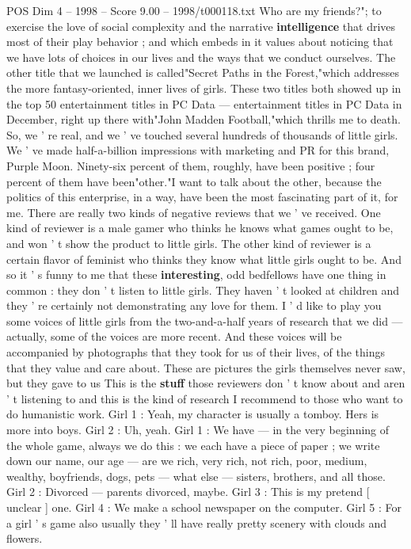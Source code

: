 \begin{textsample}{POS Dim 4 – 1998 – Score 9.00 – 1998/t000118.txt}
Who are my friends?"; to exercise the love of social complexity and the narrative \textbf{intelligence} that drives most of their play behavior ; and which embeds in it values about noticing that we have lots of choices in our lives and the ways that we conduct ourselves.
The other title that we launched is called"Secret Paths in the Forest,"which addresses the more fantasy-oriented, inner lives of girls.
These two titles both showed up in the top 50 entertainment titles in PC Data — entertainment titles in PC Data in December, right up there with"John Madden Football,"which thrills me to death.
So, we ' re real, and we ' ve touched several hundreds of thousands of little girls.
We ' ve made half-a-billion impressions with marketing and PR for this brand, Purple Moon.
Ninety-six percent of them, roughly, have been positive ; four percent of them have been"other."I want to talk about the other, because the politics of this enterprise, in a way, have been the most fascinating part of it, for me.
There are really two kinds of negative reviews that we ' ve received.
One kind of reviewer is a male gamer who thinks he knows what games ought to be, and won ' t show the product to little girls.
The other kind of reviewer is a certain flavor of feminist who thinks they know what little girls ought to be.
And so it ' s funny to me that these \textbf{interesting}, odd bedfellows have one thing in common : they don ' t listen to little girls.
They haven ' t looked at children and they ' re certainly not demonstrating any love for them.
I ' d like to play you some voices of little girls from the two-and-a-half years of research that we did — actually, some of the voices are more recent.
And these voices will be accompanied by photographs that they took for us of their lives, of the things that they value and care about.
These are pictures the girls themselves never saw, but they gave to us This is the \textbf{stuff} those reviewers don ' t know about and aren ' t listening to and this is the kind of research I recommend to those who want to do humanistic work.
Girl 1 : Yeah, my character is usually a tomboy.
Hers is more into boys.
Girl 2 : Uh, yeah.
Girl 1 : We have — in the very beginning of the whole game, always we do this : we each have a piece of paper ; we write down our name, our age — are we rich, very rich, not rich, poor, medium, wealthy, boyfriends, dogs, pets — what else — sisters, brothers, and all those.
Girl 2 : Divorced — parents divorced, maybe.
Girl 3 : This is my pretend [ unclear ] one.
Girl 4 : We make a school newspaper on the computer.
Girl 5 : For a girl ' s game also usually they ' ll have really pretty scenery with clouds and flowers.

\end{textsample}

